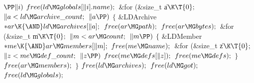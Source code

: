 ${}\PP\|i){}$\1\5
${}\\{free}(\\{ld}\MG\\{globals}[\|i].\\{name});{}$\2\6
\&{for} (\&{size\_t} \|a${}\K\T{0};{}$ ${}\|a<\\{ld}\MG\\{archive\_count};{}$
${}\|a\PP){}$\5
${}\{{}$\1\6
\&{LDArchive} ${}{*}\\{ar}\K{\AND}\\{ld}\MG\\{archives}[\|a];{}$\7
${}\\{free}(\\{ar}\MG\\{path});{}$\6
${}\\{free}(\\{ar}\MG\\{bytes});{}$\6
\&{for} (\&{size\_t} \|m${}\K\T{0};{}$ ${}\|m<\\{ar}\MG\\{count};{}$ ${}\|m%
\PP){}$\5
${}\{{}$\1\6
\&{LDMember} ${}{*}\\{me}\K{\AND}\\{ar}\MG\\{members}[\|m];{}$\7
${}\\{free}(\\{me}\MG\\{name});{}$\6
\&{for} (\&{size\_t} \|z${}\K\T{0};{}$ ${}\|z<\\{me}\MG\\{def\_count};{}$ ${}%
\|z\PP){}$\1\5
${}\\{free}(\\{me}\MG\\{defs}[\|z]);{}$\2\6
${}\\{free}(\\{me}\MG\\{defs});{}$\6
\4${}\}{}$\2\6
${}\\{free}(\\{ar}\MG\\{members});{}$\6
\4${}\}{}$\2\6
${}\\{free}(\\{ld}\MG\\{archives});{}$\6
${}\\{free}(\\{ld}\MG\\{got});{}$\6
${}\\{free}(\\{ld}\MG\\{globals});{}$\6

